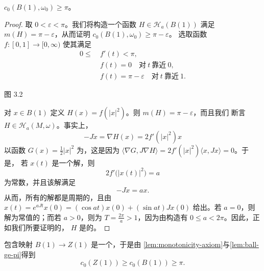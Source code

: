 \begin{lemma}\label{lem:ball-ge-pi}
$c_{0}(B(1),\omega_{0})\geq\pi$。
\end{lemma}
\begin{proof}
取 $0<\varepsilon<\pi$。我们将构造一个函数 $H\in\mathcal{H}_{a}(B(1))$%
满足 $m(H)=\pi-\varepsilon$，从而证明 $c_{0}(B(1),\omega_{0})\geq\pi-\varepsilon$。%
选取\trSmooth{}函数 $f:[0,1]\to[0,\infty)$ 使其满足
\begin{align*}
0\leq\ &f'(t)<\pi,\\
&f(t)=0\quad\text{对}\ t\ \text{靠近}\ 0,\\
&f(t)=\pi-\varepsilon\quad\text{对}\ t\ \text{靠近}\ 1.
\end{align*}

\noindent\begin{minipage}{\linewidth}
\centering
{}

图 3.2
\end{minipage}

对 $x\in B(1)$ 定义 $H(x)=f(|x|^{2})$。则 $m(H)=\pi-\varepsilon$，而且我们%
断言 $H\in\mathcal{H}_{a}(M,\omega)$。事实上，\trHamiltonianSystem
\[
-J\dot{x}=\nabla H(x)=2f'(|x|^{2})x
\]
以函数 $G(x)=\frac{1}{2}|x|^{2}$ 为\trFirstIntegral，这是因为%
$\langle\nabla G,J\nabla H\rangle=2f'(|x|^{2})\langle x,Jx\rangle=0$。于是，%
若 $x(t)$ 是一个解，则
\[
2f'\bigl(|x(t)|^{2}\bigr)=a
\]
为常数，并且该解满足
\[
-J\dot{x}=ax.
\]
从而，所有的解都是周期的，且由 $x(t)=e^{aJt}x(0)=(\cos at)x(0)+(\sin at)Jx(0)$%
给出。若 $a=0$，则解为常值的；而若 $a>0$，则\trPeriodic{}为%
$T=\frac{2\pi}{a}>1$，因为由构造有 $0\leq a<2\pi$。因此，正如我们所要证明的，%
$H$ 是\trAdmissible{}的。
\end{proof}

包含映射 $B(1)\to Z(1)$ 是一个\trSymplecticEmbedding，于是由%
\cref{lem:monotonicity-axiom}与\cref{lem:ball-ge-pi}得到
\[
c_{0}(Z(1))\geq c_{0}(B(1))\geq\pi.
\]

